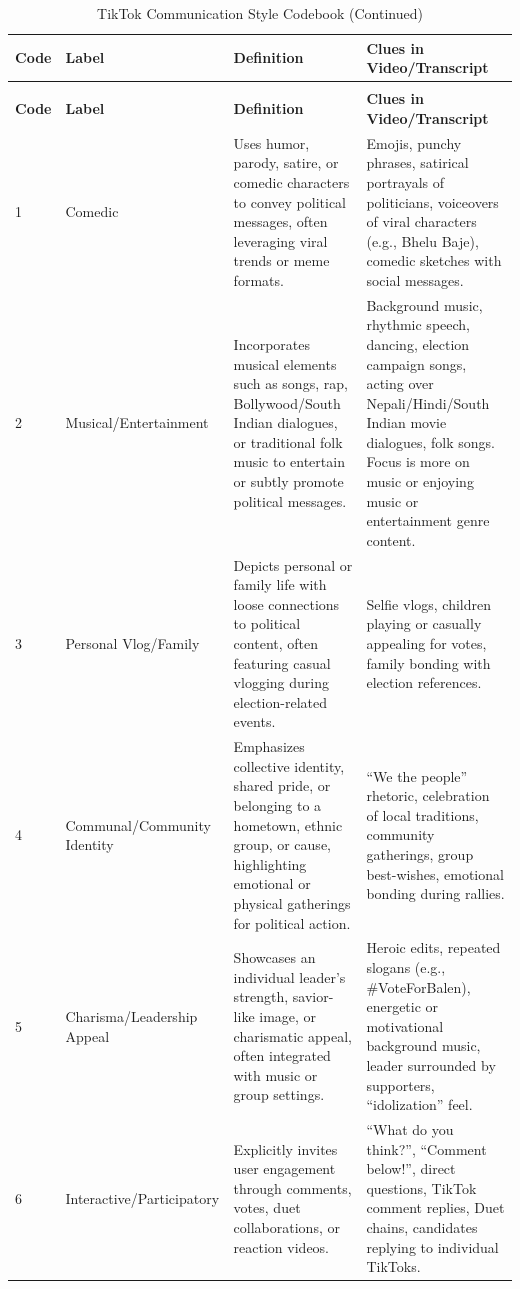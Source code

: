 \documentclass[12pt,a4paper]{report}
\begin{document}
\begin{landscape}
\begin{longtable}{@{} p{1.0cm} p{5.0cm} p{6.0cm} p{8.0cm} @{}}
\caption{TikTok Communication Style Codebook for Nepal’s 2022 Local Elections} \label{tab:codebook} \\
\toprule
\textbf{Code} & \textbf{Label} & \textbf{Definition} & \textbf{Clues in Video/Transcript} \\
\midrule
\endfirsthead
\caption[]{TikTok Communication Style Codebook (Continued)} \\
\toprule
\textbf{Code} & \textbf{Label} & \textbf{Definition} & \textbf{Clues in Video/Transcript} \\
\midrule
\endhead
\small
1 & Comedic & Uses humor, parody, satire, or comedic characters to convey political messages, often leveraging viral trends or meme formats. & Emojis, punchy phrases, satirical portrayals of politicians, voiceovers of viral characters (e.g., Bhelu Baje), comedic sketches with social messages. \\
2 & Musical/Entertainment & Incorporates musical elements such as songs, rap, Bollywood/South Indian dialogues, or traditional folk music to entertain or subtly promote political messages. & Background music, rhythmic speech, dancing, election campaign songs, acting over Nepali/Hindi/South Indian movie dialogues, folk songs. Focus is more on music or enjoying music or entertainment genre content.\\
3 & Personal Vlog/Family & Depicts personal or family life with loose connections to political content, often featuring casual vlogging during election-related events. & Selfie vlogs, children playing or casually appealing for votes, family bonding with election references. \\
4 & Communal/Community Identity & Emphasizes collective identity, shared pride, or belonging to a hometown, ethnic group, or cause, highlighting emotional or physical gatherings for political action. & ``We the people'' rhetoric, celebration of local traditions, community gatherings, group best-wishes, emotional bonding during rallies. \\
5 & Charisma/Leadership Appeal & Showcases an individual leader’s strength, savior-like image, or charismatic appeal, often integrated with music or group settings. & Heroic edits, repeated slogans (e.g., \#VoteForBalen), energetic or motivational background music, leader surrounded by supporters, ``idolization'' feel. \\
6 & Interactive/Participatory & Explicitly invites user engagement through comments, votes, duet collaborations, or reaction videos. & ``What do you think?'', ``Comment below!'', direct questions, TikTok comment replies, Duet chains, candidates replying to individual TikToks. \\

\end{longtable}
\end{landscape}
\end{document}
